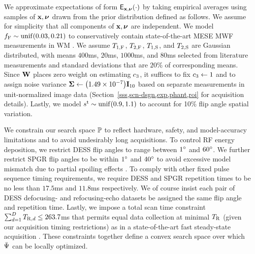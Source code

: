 We approximate expectations 
of form $\expect{\bmx,\bmnu}{\cdot}$
by taking empirical averages
using samples of $\mathbf{x},\boldsymbol{\nu}$ drawn 
from the prior distribution defined as follows.
We assume for simplicity
that all components of $\mathbf{x},\boldsymbol{\nu}$ are independent.
We model 
$\ff \sim \unif{0.03, 0.21}$
to conservatively contain
state-of-the-art MESE MWF measurements in WM
\cite{zhang:15:com}.
We assume $T_{1,\mathrm{F}}$, $T_{2,\mathrm{F}}$, $T_{1,\mathrm{S}}$, and $T_{2,\mathrm{S}}$
are Gaussian distributed,
with means $400$ms, $20$ms, $1000$ms, and $80$ms
selected from literature measurements 
\cite{mackay:94:ivv, deoni:11:com}
and standard deviations
that are $20$\% of corresponding means.
Since $\mathbf{W}$ places zero weight 
on estimating $c_{3}$, 
it suffices to fix $c_{3} \gets 1$
and to assign noise variance
$\bmSig \gets \paren{1.49 \times 10^{-7}}\eye{10}$
based on separate measurements
in unit-normalized image data
(\cf Section~\ref{sss,scn-dsgn,exp,phant,roi}
for acquisition details).
Lastly, 
we model $\stx \sim \unif{0.9,1.1}$ 
to account for 10\% flip angle spatial variation.

We constrain our search space $\mathbb{P}$
to reflect hardware, safety, and model-accuracy limitations
and to avoid undesirably long acquisitions.
To control RF energy deposition,
we restrict DESS flip angles 
to range between $1^{\circ}$ and $60^{\circ}$.
We further restrict SPGR flip angles
to be within $1^{\circ}$ and $40^{\circ}$
to avoid excessive model mismatch 
due to partial spoiling effects \cite{zur:91:sot}.
To comply with other fixed pulse sequence timing requirements,
we require DESS and SPGR repetition times
to be no less
than $17.5$ms and $11.8$ms respectively.
We of course insist each pair
of DESS defocusing- and refocusing-echo datasets
be assigned the same flip angle and repetition time.
Lastly, 
we impose a total scan time constraint 
$\sum_{d=1}^D T_{\mathrm{R},d} \leq 263.7$ms
that permits equal data collection 
at minimal $T_\mathrm{R}$
(given our acquisition timing restrictions)
as in a state-of-the-art fast steady-state acquisition
\cite{deoni:11:com}.
These constraints together define a convex search space
over which $\bar{\Psi}$ can be locally optimized.

